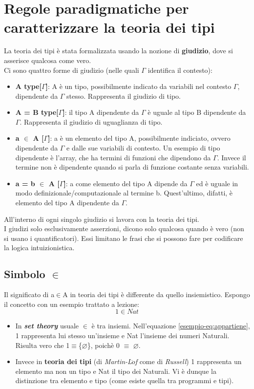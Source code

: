\documentclass[10pt,a4paper, italian]{book}
\begin{document}
\section{Regole paradigmatiche per caratterizzare la teoria dei tipi}
\label{sec:prime-regole-teoria-dei-tipi}
La teoria dei tipi \`e stata formalizzata usando la nozione di \textbf{giudizio}, dove si asserisce qualcosa come vero.\\
Ci sono quattro forme di giudizio (nelle quali $\Gamma$ identifica il contesto):
\begin{itemize}
\item \textbf{A type[$\Gamma$]}: A \`e un tipo, possibilmente indicato da variabili nel contesto $\Gamma$, dipendente da $\Gamma$ stesso. Rappresenta il giudizio di tipo.
\item \textbf{A = B type[$\Gamma$]}: il tipo A dipendente da $\Gamma$ \`e uguale al tipo B dipendente da $\Gamma$. Rappresenta il giudizio di uguaglianza di tipo.
\item \textbf{a $\in$ A [$\Gamma$]}: a \`e un elemento del tipo A, possibilmente indiciato, ovvero dipendente da $\Gamma$ e dalle sue variabili di contesto. Un esempio di tipo dipendente \`e l'array, che ha termini di funzioni che dipendono da $\Gamma$. Invece il termine non \`e dipendente quando si parla di funzione costante senza variabili.
\item \textbf{a = b $\in$ A [$\Gamma$]}: a come elemento del tipo A dipende da $\Gamma$ ed \`e uguale in modo definizionale/computazionale al termine b. Quest'ultimo, difatti, \`e elemento del tipo A dipendente da $\Gamma$.
\end{itemize}
\noindent
All'interno di ogni singolo giudizio si lavora con la teoria dei tipi.\\
I giudizi solo esclusivamente asserzioni, dicono solo qualcosa quando \`e vero (non si usano i quantificatori). Essi limitano le frasi che si possono fare per codificare la logica intuizionistica. 
\subsection{Simbolo $\in$}
\label{subsec:simbolo-appartiene}
Il significato di a$\in$A in teoria dei tipi \`e differente da quello insiemistico. Espongo il concetto con un esempio trattato a lezione:
\begin{equation}
1 \in Nat \label{esempio-eq:appartiene}
\end{equation}


\begin{itemize}
\item In \textbf{\textit{set theory}} usuale $\in$ \`e tra insiemi. Nell'equazione \ref{esempio-eq:appartiene}, 1 rappresenta lui stesso un'insieme e Nat l'insieme dei numeri Naturali.
Risulta vero che 1$\equiv$\{$\varnothing$\}, poich\`e 0 $\equiv$ $\varnothing$.
\item Invece in \textbf{teoria dei tipi} (di \textit{Martin-L$\ddot{o}$f} come di \textit{Russell})
1 rappresenta un elemento ma non un tipo e Nat il tipo dei Naturali. Vi \`e dunque la distinzione tra elemento e tipo (come esiste quella tra programmi e tipi).
\end{itemize}
\end{document}
